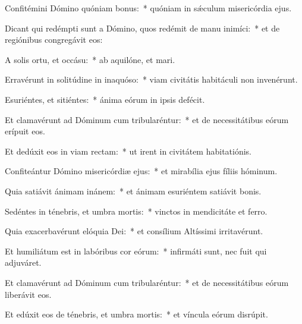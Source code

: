 \item Confitémini Dómino quóniam bonus:~* quóniam in sǽculum misericórdia ejus.

\item Dicant qui redémpti sunt a Dómino, quos redémit de manu inimíci:~* et de regiónibus congregávit eos:

\item A solis ortu, et occásu:~* ab aquilóne, et mari.

\item Erravérunt in solitúdine in inaquóso:~* viam civitátis habitáculi non invenérunt.

\item Esuriéntes, et sitiéntes:~* ánima eórum in ipsis defécit.

\item Et clamavérunt ad Dóminum cum tribularéntur:~* et de necessitátibus eórum erípuit eos.

\item Et dedúxit eos in viam rectam:~* ut irent in civitátem habitatiónis.

\item Confiteántur Dómino misericórdiæ ejus:~* et mirabília ejus fíliis hóminum.

\item Quia satiávit ánimam inánem:~* et ánimam esuriéntem satiávit bonis.

\item Sedéntes in ténebris, et umbra mortis:~* vinctos in mendicitáte et ferro.

\item Quia exacerbavérunt elóquia Dei:~* et consílium Altíssimi irritavérunt.

\item Et humiliátum est in labóribus cor eórum:~* infirmáti sunt, nec fuit qui adjuváret.

\item Et clamavérunt ad Dóminum cum tribularéntur:~* et de necessitátibus eórum liberávit eos.

\item Et edúxit eos de ténebris, et umbra mortis:~* et víncula eórum disrúpit.
